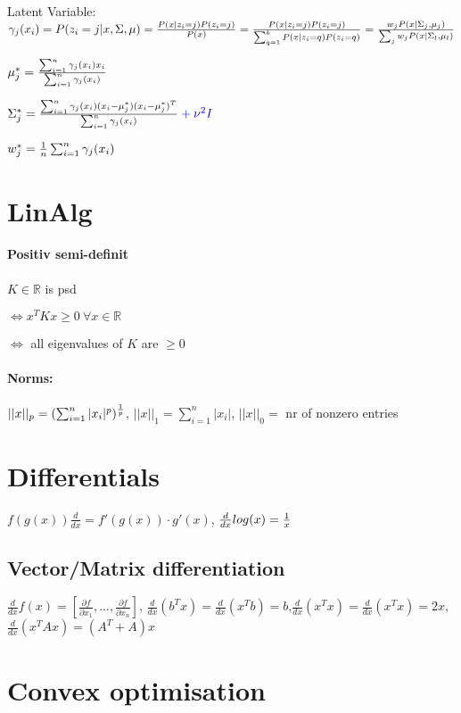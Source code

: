 \documentclass[11pt,twocolumn]{article}
\begin{document}
Latent Variable: $\gamma_j(x_i) 
= P(z_i=j|x,\Sigma, \mu) 
= { {P(x|z_i=j)P(z_i=j)} \over {P(x)}}
= { {P(x|z_i=j)P(z_i=j)} \over { \sum_{q=1}^k  P(x|z_i=q)P(z_i=q)}}
= {{w_j P(x|\Sigma_j, \mu_j)}\over{\sum_j w_j P(x|\Sigma_l , \mu_l)}}$ 


$\mu_j^* = {{\sum_{i=1}^n \gamma_j(x_i)x_i}\over{\sum_{i=1}^n \gamma_j(x_i)}} $ 

$\Sigma_j^* = {{\sum_{i=1}^n \gamma_j (x_i)(x_i - \mu_j^*)(x_i-\mu_j^*)^T}\over{\sum_{i=1}^n \gamma_j(x_i)}} \color{blue} + \nu^2 I$

$w_j^* = {1 \over {n}} \sum_{i=1}^n \gamma_j(x_i)$

\section{LinAlg}

\paragraph{Positiv semi-definit}$K \in \mathbb{R}$ is psd 

$\iff x^TKx \geq 0 ~\forall x \in \mathbb{R}$


$\iff$ all eigenvalues of $K$ are $\geq 0$


\paragraph{Norms:} $||x||_p = (\sum_{i=1}^n |x_i|^p )^{1 \over p}$, $||x||_1 = \sum_{i=1}^n |x_i|$, $||x||_0 = $ nr of nonzero entries

\section{Differentials}

$ f(g(x)) \frac{d}{dx} = f'(g(x)) \cdot g'(x)$, $ {d \over {dx}} log(x) = {1 \over x}$

\subsection{Vector/Matrix differentiation}

$\frac{d}{dx} f(x) = \left[ \frac{\partial f }{\partial x_1} ,...,\frac{\partial f}{\partial x_n} \right]$, $\frac{d}{dx}(b^T x) = \frac{d}{dx} (x^T b) = b$,$\frac{d}{dx}(x^T x) = \frac{d}{dx} (x^T x) = 2x$,$\frac{d}{dx}(x^T A x) = (A^T + A) x$


\section{Convex optimisation}
\end{document}

